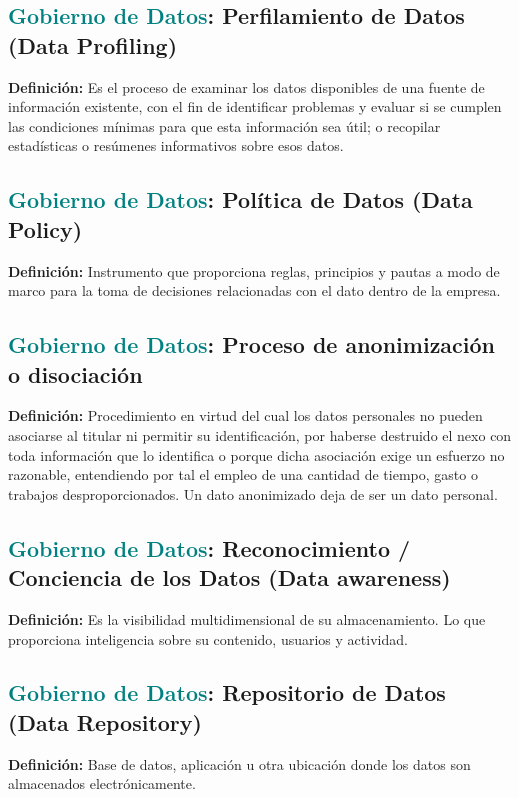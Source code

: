 \documentclass[12pt]{article}
\begin{document}
\subsection{\textcolor{teal}{Gobierno de Datos}: Perfilamiento de Datos (Data Profiling)}
\textbf{Definición:} Es el proceso de examinar los datos disponibles de una fuente de información existente, con el fin de identificar problemas y evaluar si se cumplen las condiciones mínimas para que esta información sea útil; o recopilar estadísticas o resúmenes informativos sobre esos datos.
\subsection{\textcolor{teal}{Gobierno de Datos}: Política de Datos (Data Policy)}
\textbf{Definición:} Instrumento que proporciona reglas, principios y pautas a modo de marco para la toma de decisiones relacionadas con el dato dentro de la empresa.
\subsection{\textcolor{teal}{Gobierno de Datos}: Proceso de anonimización o disociación}
\textbf{Definición:} Procedimiento en virtud del cual los datos personales no pueden asociarse al titular ni permitir su identificación, por haberse destruido el nexo con toda información que lo identifica o porque dicha asociación exige un esfuerzo no razonable, entendiendo por tal el empleo de una cantidad de tiempo, gasto o trabajos desproporcionados. Un dato anonimizado deja de ser un dato personal. 
\subsection{\textcolor{teal}{Gobierno de Datos}: Reconocimiento / Conciencia de los Datos (Data awareness)}
\textbf{Definición:} Es la visibilidad multidimensional de su almacenamiento. Lo que proporciona inteligencia sobre su contenido, usuarios y actividad.
\subsection{\textcolor{teal}{Gobierno de Datos}: Repositorio de Datos (Data Repository)}
\textbf{Definición:} Base de datos, aplicación u otra ubicación donde los datos son almacenados electrónicamente.
\end{document}
